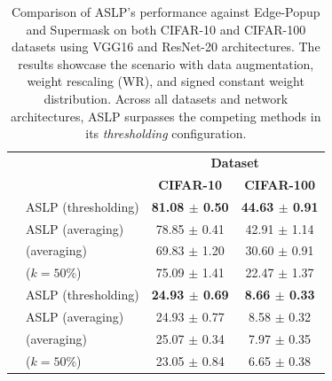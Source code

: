\begin{table}[htbp]
  \centering\begin{tabular}{llcc}
    \cmidrule[\heavyrulewidth]{3-4}
     &  & \multicolumn{2}{c}{\textbf{Dataset}} \\
     &  & \textbf{CIFAR-10} & \textbf{CIFAR-100}  \\
    \toprule
    \multirow{6}{*}{} \multirow{4}{*}{\textbf{ResNet-20}} & ASLP (thresholding) &\textbf{ 81.08 $\pm$ 0.50} & \textbf{44.63 $\pm$ 0.91} \\
    & ASLP (averaging)& 78.85 $\pm$ 0.41 & 42.91 $\pm$ 1.14 \\ 
    & \cite{DBLP:conf/nips/ZhouLLY19} (averaging)  & 69.83 $\pm$ 1.20 & 30.60 $\pm$ 0.91 \\
    & \cite{DBLP:conf/cvpr/RamanujanWKFR20} ($k=50\%$) & 75.09 $\pm$ 1.41 & 22.47 $\pm$ 1.37 \\
    \midrule
     \multirow{4}{*}{\textbf{VGG16}} & ASLP (thresholding) & \textbf{24.93 $\pm$ 0.69} & \textbf{8.66 $\pm$ 0.33} \\
     & ASLP (averaging) & 24.93 $\pm$ 0.77 & 8.58 $\pm$ 0.32 \\
     & \cite{DBLP:conf/nips/ZhouLLY19} (averaging)  & 25.07 $\pm$ 0.34 & 7.97 $\pm$ 0.35 \\
     & \cite{DBLP:conf/cvpr/RamanujanWKFR20} ($k=50\%$) & 23.05 $\pm$ 0.84 & 6.65 $\pm$ 0.38 \\
    \bottomrule
    \end{tabular}
  \caption{Comparison of ASLP's performance against Edge-Popup and Supermask
  \cite{DBLP:conf/cvpr/RamanujanWKFR20,DBLP:conf/nips/ZhouLLY19} on both
  CIFAR-10 and CIFAR-100 datasets using VGG16 and ResNet-20 architectures. The
  results showcase the scenario with data augmentation, weight rescaling (WR),
  and signed constant weight distribution. Across all datasets and network
  architectures, ASLP surpasses the competing methods in its \textit{thresholding}
  configuration.}
  \label{tab:chap2:r20_VGG16_performances_comparison}
\end{table}

